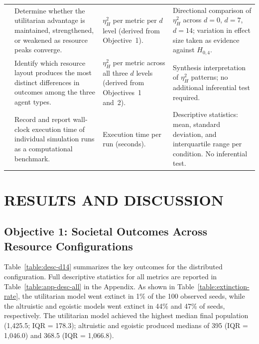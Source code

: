\documentclass{icsthesis}
\begin{document}
\begin{mainmatter}
\begin{table}[H]
\begin{tabular}{
				>{\raggedright\arraybackslash}p{0.4cm}
				>{\raggedright\arraybackslash}p{3.2cm}
				>{\raggedright\arraybackslash}p{3.2cm}
				>{\raggedright\arraybackslash}p{6.2cm}
			}
			2 &
				Determine whether the utilitarian advantage is maintained, strengthened, or weakened as resource peaks converge. &
				$\eta^2_H$ per metric per $d$ level (derived from Objective~1). &
				Directional comparison of $\eta^2_H$ across $d = 0$, $d = 7$, $d = 14$; variation in effect size taken as evidence against $H_{0,4}$. \\

			3 &
				Identify which resource layout produces the most distinct differences in outcomes among the three agent types. &
				$\eta^2_H$ per metric across all three $d$ levels (derived from Objectives~1 and~2). &
				Synthesis interpretation of $\eta^2_H$ patterns; no additional inferential test required. \\

			4 &
				Record and report wall-clock execution time of individual simulation runs as a computational benchmark. &
				Execution time per run (seconds). &
				Descriptive statistics: mean, standard deviation, and interquartile range per condition. No inferential test. \\
			\hline
			\end{tabular}
			\end{table}

		\section{RESULTS AND DISCUSSION}

		\subsection{Objective 1: Societal Outcomes Across Resource Configurations}

Table~\ref{table:desc-d14} summarizes the key outcomes for the distributed configuration. Full descriptive statistics for all metrics are reported in Table~\ref{table:app-desc-all} in the Appendix. As shown in Table~\ref{table:extinction-rate}, the utilitarian model went extinct in 1\% of the 100 observed seeds, while the altruistic and egoistic models went extinct in 44\% and 47\% of seeds, respectively. The utilitarian model achieved the highest median final population (1,425.5; IQR = 178.3); altruistic and egoistic produced medians of 395 (IQR = 1,046.0) and 368.5 (IQR = 1,066.8).


\end{mainmatter}
\end{document}
